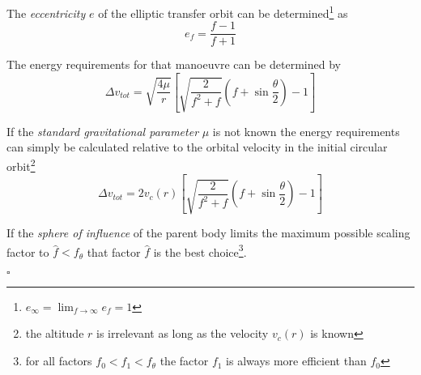 \documentclass[a4paper, 11pt]{article}
\begin{document}
The \emph{eccentricity} $e$ of the elliptic transfer orbit can be determined\footnote{$e_\infty = \lim_{f\to\infty}e_f = 1$} as
$$e_f = \frac{f-1}{f+1}$$

The energy requirements for that manoeuvre can be determined by
$$\Delta{}v_{tot}= \sqrt{\frac{4\mu}r}\left[ \sqrt{\frac{2}{f^2 + f}} \left(f + \sin\frac{\theta}2 \right) - 1  \right]$$

If the \emph{standard gravitational parameter} $\mu$ is not known the energy requirements can simply be calculated relative to the orbital velocity in the initial circular orbit\footnote{the altitude $r$ is irrelevant as long as the velocity $v_c(r)$ is known}
$$\Delta v_{tot}= 2 v_c(r)\left[ \sqrt{\frac{2}{f^2 + f}} \left(f + \sin\frac{\theta}2 \right) - 1  \right]$$

If the \emph{sphere of influence} of the parent body limits the maximum possible scaling factor to $\hat f < f_\theta$ that factor $\hat f$ is the best choice\footnote{for all factors $f_0 < f_1 < f_\theta$ the factor $f_1$ is always more efficient than $f_0$}.

\hfill $\square$
\end{document}
